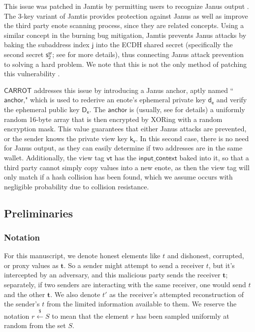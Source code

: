 \documentclass{article}
\theoremstyle{definition}
\newcommand{\6}{\mathbf}
\newcommand{\7}{\mathcal}
\renewcommand{\sf}[1]{{\mathsf{#1}}}
\newcommand{\carr}{$\sf{CARROT}$ }
\begin{document}
This issue was patched in Jamtis by permitting users to recognize Janus output \cite{Jamtis}. 
The 3-key variant of Jamtis provides protection against Janus as well as improve the third party enote scanning process, since they are related concepts.
Using a similar concept in the burning bug mitigation, Jamtis prevents Janus attacks by baking the subaddress index $\sf{j}$ into the ECDH shared secret (specifically the second secret $\sf{s_{2}^{sr}}$; see \cite[Section 8.4.3]{ImplemetingSeraphis} for more details), thus connecting Janus attack prevention to solving a hard problem. 
We note that this is not the only method of patching this vulnerability \cite{JanusMitigation}.
\medskip 

\carr addresses this issue by introducing a Janus anchor, aptly named ``$\sf{anchor}$," which is used to rederive an enote's ephemeral private key $\sf{d_e}$ and verify the ephemeral public key $\sf{D_e}$. 
The $\sf{anchor}$ is (usually, see \cite[Section 7.4]{Carrot} for details) a uniformly random 16-byte array that is then encrypted by XORing with a random encryption mask.
This value guarantees that either Janus attacks are prevented, or the sender knows the private view key $\sf{k_v}$. In this second case, there is no need for Janus output, as they can easily determine if two addresses are in the same wallet. 
Additionally, the view tag $\sf{vt}$ has the $\sf{input\_context}$ baked into it, so that a third party cannot simply copy values into a new enote, as then the view tag will only match if a hash collision has been found, which we assume occurs with negligible probability due to collision resistance. 









\subsection{Preliminaries}\label{sec:preliminaries} 



\subsubsection{Notation}
For this manuscript, we denote honest elements like $t$ and dishonest, corrupted, or proxy values as $\6t$. So a sender might attempt to send a receiver $t$, but it's intercepted by an adversary, and this malicious party sends the receiver $\6t$; separately, if two senders are interacting with the same receiver, one would send $t$ and the other $\6t$. We also denote $t'$ as the receiver's attempted reconstruction of the sender's $t$ from the limited information available to them. We reserve the notation $r \xleftarrow{\$} S$ to mean that the element $r$ has been sampled uniformly at random from the set $S$.
\medskip 
\end{document}
